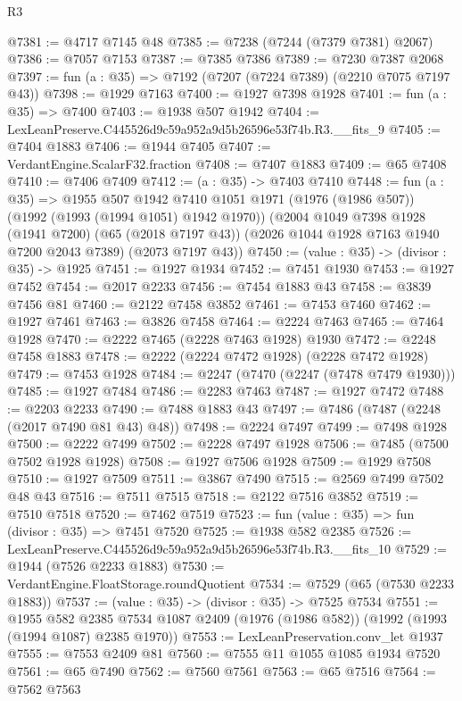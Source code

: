 \begin{lexlean}{R3}
\begin{coremodule}
@7381 := @4717 @7145 @48
@7385 := @7238 (@7244 (@7379 @7381) @2067)
@7386 := @7057 @7153
@7387 := @7385 @7386
@7389 := @7230 @7387 @2068
@7397 := fun (a : @35) => @7192 (@7207 (@7224 @7389) (@2210 @7075 @7197 @43))
@7398 := @1929 @7163
@7400 := @1927 @7398 @1928
@7401 := fun (a : @35) => @7400
@7403 := @1938 @507 @1942
@7404 := LexLeanPreserve.C445526d9c59a952a9d5b26596e53f74b.R3.__fits_9
@7405 := @7404 @1883
@7406 := @1944 @7405
@7407 := VerdantEngine.ScalarF32.fraction
@7408 := @7407 @1883
@7409 := @65 @7408
@7410 := @7406 @7409
@7412 := (a : @35) -> @7403 @7410
@7448 := fun (a : @35) =>
  @1955
    @507
    @1942
    @7410
    @1051
    @1971
    (@1976 (@1986 @507))
    (@1992 (@1993 (@1994 @1051) @1942 @1970))
    (@2004
      @1049
      @7398
      @1928
      (@1941 @7200)
      (@65 (@2018 @7197 @43))
      (@2026 @1044 @1928 @7163 @1940 @7200 @2043 @7389)
      (@2073 @7197 @43))
@7450 := (value : @35) -> (divisor : @35) -> @1925
@7451 := @1927 @1934
@7452 := @7451 @1930
@7453 := @1927 @7452
@7454 := @2017 @2233
@7456 := @7454 @1883 @43
@7458 := @3839 @7456 @81
@7460 := @2122 @7458 @3852
@7461 := @7453 @7460
@7462 := @1927 @7461
@7463 := @3826 @7458
@7464 := @2224 @7463
@7465 := @7464 @1928
@7470 := @2222 @7465 (@2228 @7463 @1928) @1930
@7472 := @2248 @7458 @1883
@7478 := @2222 (@2224 @7472 @1928) (@2228 @7472 @1928)
@7479 := @7453 @1928
@7484 := @2247 (@7470 (@2247 (@7478 @7479 @1930)))
@7485 := @1927 @7484
@7486 := @2283 @7463
@7487 := @1927 @7472
@7488 := @2203 @2233
@7490 := @7488 @1883 @43
@7497 := @7486 (@7487 (@2248 (@2017 @7490 @81 @43) @48))
@7498 := @2224 @7497
@7499 := @7498 @1928
@7500 := @2222 @7499
@7502 := @2228 @7497 @1928
@7506 := @7485 (@7500 @7502 @1928 @1928)
@7508 := @1927 @7506 @1928
@7509 := @1929 @7508
@7510 := @1927 @7509
@7511 := @3867 @7490
@7515 := @2569 @7499 @7502 @48 @43
@7516 := @7511 @7515
@7518 := @2122 @7516 @3852
@7519 := @7510 @7518
@7520 := @7462 @7519
@7523 := fun (value : @35) => fun (divisor : @35) => @7451 @7520
@7525 := @1938 @582 @2385
@7526 := LexLeanPreserve.C445526d9c59a952a9d5b26596e53f74b.R3.__fits_10
@7529 := @1944 (@7526 @2233 @1883)
@7530 := VerdantEngine.FloatStorage.roundQuotient
@7534 := @7529 (@65 (@7530 @2233 @1883))
@7537 := (value : @35) -> (divisor : @35) -> @7525 @7534
@7551 := @1955
    @582
    @2385
    @7534
    @1087
    @2409
    (@1976 (@1986 @582))
    (@1992 (@1993 (@1994 @1087) @2385 @1970))
@7553 := LexLeanPreservation.conv_let @1937
@7555 := @7553 @2409 @81
@7560 := @7555 @11 @1055 @1085 @1934 @7520
@7561 := @65 @7490
@7562 := @7560 @7561
@7563 := @65 @7516
@7564 := @7562 @7563

\end{coremodule}
\end{lexlean}

